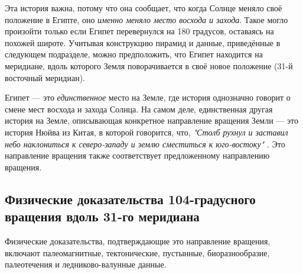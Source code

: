 \documentclass[10pt,twocolumn,letterpaper]{article}
\begin{document}
Эта история важна, потому что она сообщает, что когда Солнце меняло своё положение в Египте, оно \textit{именно меняло место восхода и захода}. Такое могло произойти только если Египет перевернулся на 180 градусов, оставаясь на похожей широте. Учитывая конструкцию пирамид и данные, приведённые в следующем подразделе, можно предположить, что Египет находится на меридиане, вдоль которого Земля поворачивается в своё новое положение (31-й восточный меридиан).

Египет — это \textit{единственное} место на Земле, где история однозначно говорит о смене мест восхода и захода Солнца. На самом деле, единственная другая история на Земле, описывающая конкретное направление вращения Земли — это история Нюйва из Китая, в которой говорится, что, \textit{"Столб рухнул и заставил небо наклониться к северо-западу и землю сместиться к юго-востоку"} \cite{8}. Это направление вращения также соответствует предложенному направлению вращения.

\subsection{Физические доказательства 104-градусного вращения вдоль 31-го меридиана}

Физические доказательства, подтверждающие это направление вращения, включают палеомагнитные, тектонические, пустынные, биоразнообразие, палеотечения и ледниково-валунные данные.
\end{document}
